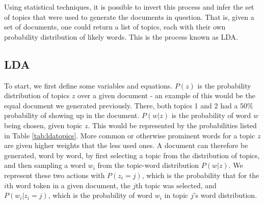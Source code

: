 \documentclass[a4paper]{article}
\begin{document}
Using statistical techniques, it is possible to invert this process and infer the set of topics that were used to generate the documents in question. That is, given a set of documents, one could return a list of topics, each with their own probability distribution of likely words. This is the process known as LDA.

\subsection{LDA}
To start, we first define some variables and equations. $P(z)$ is the probability distribution of topics $z$ over a given document - an example of this would be the equal document we generated previously. There, both topics 1 and 2 had a $50\%$ probability of showing up in the document. $P(w | z)$ is the probability of word $w$ being chosen, given topic $z$. This would be represented by the probabilities listed in Table \ref{tab:ldatopics}. More common or otherwise prominent words for a topic $z$ are given higher weights that the less used ones. A document can therefore be generated, word by word, by first selecting a topic from the distribution of topics, and then sampling a word $w_i$ from the topic-word distribution $P(w | z)$. We represent these two actions with $P(z_i = j)$, which is the probability that for the $i$th word token in a given document, the $j$th topic was selected, and $P(w_i | z_i = j)$, which is the probability of word $w_i$ in topic $j$'s word distribution.
\end{document}
